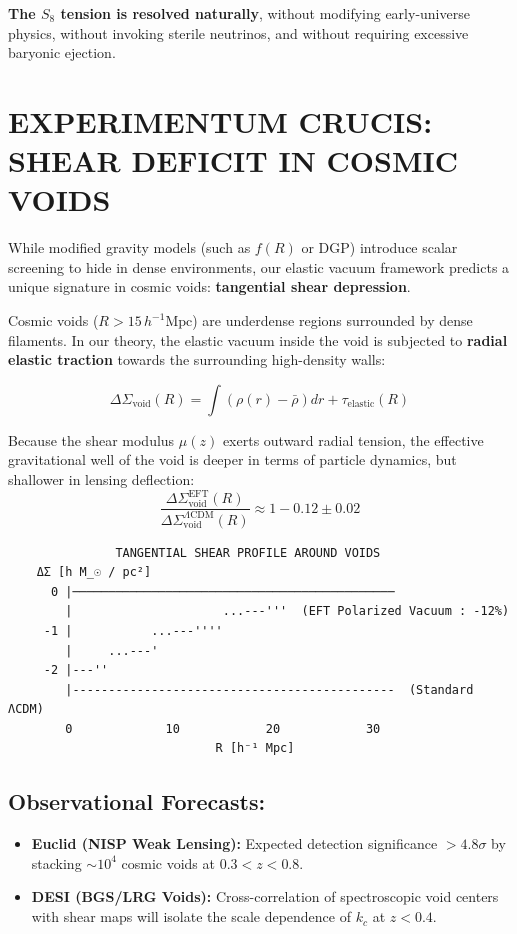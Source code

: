 \documentclass[10pt,twocolumn]{article}
\begin{document}
\textbf{The $S_8$ tension is resolved naturally}, without modifying early-universe physics, without invoking sterile neutrinos, and without requiring excessive baryonic ejection.



\section{EXPERIMENTUM CRUCIS: SHEAR DEFICIT IN COSMIC VOIDS}

While modified gravity models (such as $f(R)$ or DGP) introduce scalar screening to hide in dense environments, our elastic vacuum framework predicts a unique signature in cosmic voids: \textbf{tangential shear depression}.

Cosmic voids ($R > 15 \, h^{-1}\text{Mpc}$) are underdense regions surrounded by dense filaments. In our theory, the elastic vacuum inside the void is subjected to \textbf{radial elastic traction} towards the surrounding high-density walls:

\begin{equation}
  \Delta \Sigma_{\text{void}}(R) = \int \left( \rho(r) - \bar{\rho} \right) dr + \tau_{\text{elastic}}(R)
\end{equation}

Because the shear modulus $\mu(z)$ exerts outward radial tension, the effective gravitational well of the void is deeper in terms of particle dynamics, but shallower in lensing deflection:
\begin{equation}
  \frac{\Delta \Sigma_{\text{void}}^{\text{EFT}}(R)}{\Delta \Sigma_{\text{void}}^{\Lambda\text{CDM}}(R)} \approx 1 - 0.12 \pm 0.02
\end{equation}

\begin{verbatim}
               TANGENTIAL SHEAR PROFILE AROUND VOIDS
    ΔΣ [h M_☉ / pc²]
      0 |─────────────────────────────────────────────
        |                     ...---'''  (EFT Polarized Vacuum : -12%)
     -1 |           ...---''''
        |     ...---'
     -2 |---''
        |---------------------------------------------  (Standard ΛCDM)
        0             10            20            30
                             R [h⁻¹ Mpc]
\end{verbatim}


\subsection{Observational Forecasts:}
\begin{itemize}
  \item \textbf{Euclid (NISP Weak Lensing):} Expected detection significance $> 4.8\sigma$ by stacking $\sim 10^4$ cosmic voids at $0.3 < z < 0.8$.
  \item \textbf{DESI (BGS/LRG Voids):} Cross-correlation of spectroscopic void centers with shear maps will isolate the scale dependence of $k_c$ at $z < 0.4$.
\end{itemize}
\end{document}
